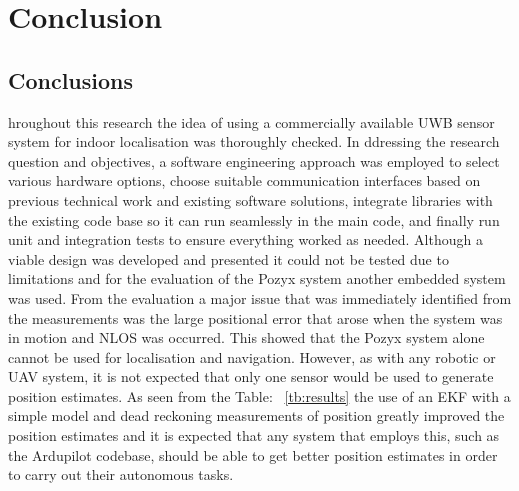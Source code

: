 \chapter{Conclusion}\label{ch:conclusion}
\section{Conclusions}\label{sec:conclusions}
hroughout this research the idea of using a commercially available UWB sensor system for indoor localisation was thoroughly checked.
In ddressing the research question and objectives, a software engineering approach was employed to select various hardware options, choose suitable communication interfaces based on previous technical work and existing software solutions,
integrate libraries with the existing code base so it can run seamlessly in the main code, and finally run unit and integration tests to ensure everything worked as needed.
Although a viable design was developed and presented it could not be tested due to limitations and for the evaluation of the Pozyx system another embedded system was used.
From the evaluation a major issue that was immediately identified from the measurements was the large positional error that arose when the system was in motion and NLOS was occurred.
This showed that the Pozyx system alone cannot be used for localisation and navigation.
However, as with any robotic or UAV system, it is not expected that only one sensor would be used to generate position estimates.
As seen from the Table: ~\ref{tb:results} the use of an EKF with a simple model and dead reckoning measurements of position greatly improved the position estimates and it is expected that any system that employs this, such as the Ardupilot codebase, should be able to get better position estimates in order to carry out
their autonomous tasks.

